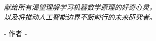 \newpage
\thispagestyle{empty}

\vspace*{4cm}

\begin{center}
    \Large\textit{
        献给所有渴望理解学习机器数学原理的好奇心灵，\\
        以及将推动人工智能边界不断前行的未来研究者。
    }
\end{center}

\vspace{3cm}

\begin{flushright}
    \Large - 作者 -
\end{flushright}

\newpage
